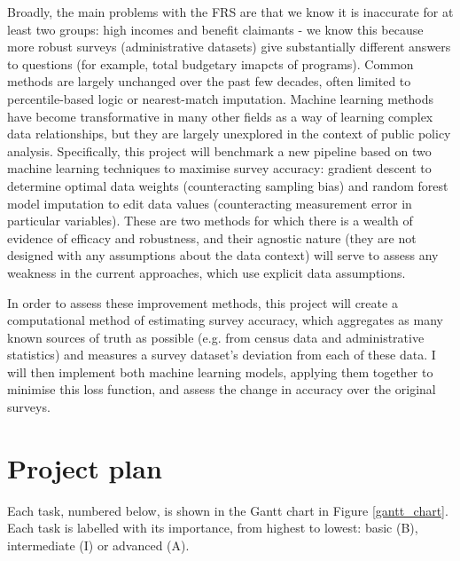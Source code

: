 \documentclass[twocolumn]{article}
\begin{document}
Broadly, the main problems with the FRS are that we know it is inaccurate for at least two groups: high incomes and benefit claimants - we know this because more robust surveys (administrative datasets) give substantially different answers to questions (for example, total budgetary imapcts of programs). Common methods are largely unchanged over the past few decades, often limited to percentile-based logic or nearest-match imputation. Machine learning methods have become transformative in many other fields as a way of learning complex data relationships, but they are largely unexplored in the context of public policy analysis. Specifically, this project will benchmark a new pipeline based on two machine learning techniques to maximise survey accuracy: gradient descent to determine optimal data weights (counteracting sampling bias) and random forest model imputation to edit data values (counteracting measurement error in particular variables). These are two methods for which there is a wealth of evidence of efficacy and robustness, and their agnostic nature (they are not designed with any assumptions about the data context) will serve to assess any weakness in the current approaches, which use explicit data assumptions.

In order to assess these improvement methods, this project will create a computational method of estimating survey accuracy, which aggregates as many known sources of truth as possible (e.g. from census data and administrative statistics) and measures a survey dataset's deviation from each of these data. I will then implement both machine learning models, applying them together to minimise this loss function, and assess the change in accuracy over the original surveys.
\section{Project plan}

Each task, numbered below, is shown in the Gantt chart in Figure \ref{gantt_chart}. Each task is labelled with its importance, from highest to lowest: basic (B), intermediate (I) or advanced (A).
\end{document}
